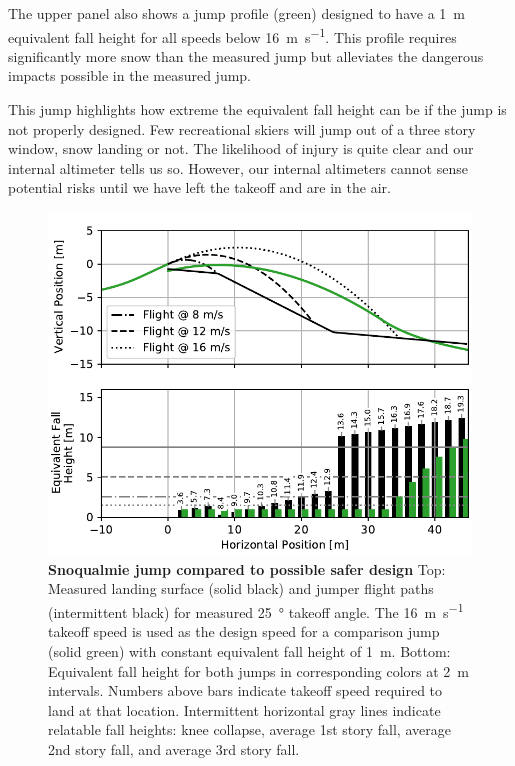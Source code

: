 \documentclass[smallextended]{svjour3}       %
\begin{document}
The upper panel also shows a jump profile (green) designed to have a 1~\si{\meter}
equivalent fall height for all speeds below 16~\si{\meter\per\second}. This
profile requires significantly more snow than the measured jump but alleviates
the dangerous impacts possible in the measured jump.

This jump highlights how extreme the equivalent fall height can be if the jump
is not properly designed. Few recreational skiers will jump out
of a three story window, snow landing or not. The likelihood of injury is quite
clear and our internal altimeter tells us so. However, our internal altimeters
cannot sense potential risks until we have left the takeoff and are in the air.
%
\begin{figure}
  \centering
  \includegraphics[width=5.25in]{figures/salvini-v-snoqualmie.pdf}
  \caption{\textbf{Snoqualmie jump compared to possible safer design}
  Top: Measured landing surface (solid black) and jumper flight paths
  (intermittent black) for measured 25~\si{\degree} takeoff angle. The
  16~\si{\meter\per\second} takeoff speed is used as the design speed for a
  comparison jump (solid green) with constant equivalent fall height of
  1~\si{\meter}.
  Bottom: Equivalent fall height for both jumps in corresponding colors
  at 2~\si{\meter} intervals. Numbers above bars indicate takeoff speed
  required to land at that location.
  Intermittent horizontal gray lines indicate relatable fall heights: knee
  collapse, average 1st story fall, average 2nd story fall, and average 3rd
  story fall.
  }
  \label{fig:salvini-v-snoqualmie}
\end{figure}
\end{document}
